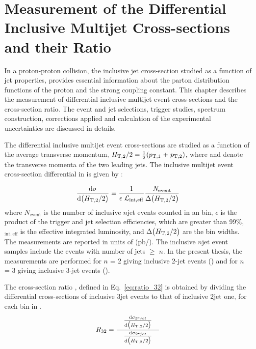 \chapter{Measurement of the Differential Inclusive Multijet Cross-sections and their Ratio}
\label{chap:Measurement}
In a proton-proton collision, the inclusive jet cross-section studied as a function of jet properties, provides essential information about the parton distribution functions of the proton and the strong coupling constant. This chapter describes the measurement of differential inclusive multijet event cross-sections and the cross-section ratio. The event and jet selections, trigger studies, spectrum construction, corrections applied and calculation of the experimental uncertainties are discussed in details.

The differential inclusive multijet event cross-sections are studied as a function of the average transverse momentum, $\httwo = \frac{1}{2}(\ptone~\plus \pttwo)$, where \ptone and \pttwo denote the transverse momenta of the two leading jets. The inclusive multijet event cross-section differential in \httwo is given by :

\begin{equation}
 \label{eq:inclusive_formula}
 {\dd{\sigma}{\big(\httwo\big)}} = \frac{1}{\epsilon~\lumi_{\mathrm{int,eff}}}\frac{N_\mathrm{event}}{\Delta\big(\httwo\big)}
\end{equation}
where $N_\mathrm{event}$ is the number of inclusive $n$\hy jet events counted in an \httwo bin, $\epsilon$ is the product of the trigger and jet selection efficiencies, which are greater than 99\%, \lumins$_{\mathrm{int,eff}}$ is the effective integrated luminosity, and $ \Delta\big(H_{\mathrm{T,2}}/2\big)$ are the bin widths. The measurements are reported in units of (pb/\GeV). The inclusive $n$\hy jet event samples include the events with number of jets $\geq$ $n$. In the present thesis, the measurements are performed for $n$ = 2 giving inclusive 2-jet events (\njt) and for $n$ = 3 giving inclusive 3-jet events (\njth). 

The cross-section ratio \rations, defined in Eq.~\ref{eq:ratio_32} is obtained by dividing the differential cross-sections of inclusive 3\hy jet events to that of inclusive 2\hy jet one, for each bin in \httwo.
\begin{equation}
 \label{eq:ratio_32}
 \ratio = \frac[10pt]{{\dd{\sigma_{3\hy jet}}{\big(\httwo\big)}}}{\dd{\sigma_{2\hy jet}}{\big(\httwo\big)}}
\end{equation}

